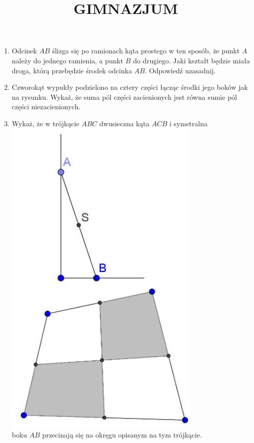 \documentclass[10pt]{article}
\title{GIMNAZJUM }
\author{}
\date{}
\begin{document}
\maketitle
\begin{enumerate}
  \item Odcinek \(A B\) ślizga się po ramionach kąta prostego w ten sposób, że punkt \(A\) należy do jednego ramienia, a punkt \(B\) do drugiego. Jaki kształt będzie miała droga, którą przebędzie środek odcinka \(A B\). Odpowiedź uzasadnij.
  \item Czworokąt wypukły podzielono na cztery części łącząc środki jego boków jak na rysunku. Wykaż, że suma pól części zacienionych jest równa sumie pól części niezacienionych.
  \item Wykaż, że w trójkącie \(A B C\) dwusieczna kąta \(A C B\) i symetralna\\
\includegraphics[max width=\textwidth, center]{2024_11_21_9bcf201a4fb59f89a03bg-1(1)}\\
boku \(A B\) przecinają się na okręgu opisanym na tym trójkącie.
\end{enumerate}
\end{document}
